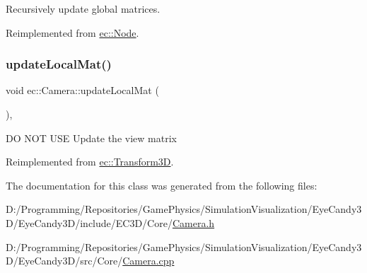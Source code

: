 Recursively update global matrices. 



Reimplemented from \mbox{\hyperlink{classec_1_1_node_a12a9b14ccc434c52404e262ef5db6f80}{ec\+::\+Node}}.

\mbox{\label{classec_1_1_camera_acff95ac4ca039715d67c83111d03b8c1}} 
\subsubsection{\texorpdfstring{update\+Local\+Mat()}{updateLocalMat()}}
{\footnotesize\ttfamily void ec\+::\+Camera\+::update\+Local\+Mat (\begin{DoxyParamCaption}{ }\end{DoxyParamCaption})\hspace{0.3cm}{\ttfamily [override]}, {\ttfamily [virtual]}}

DO N\+OT U\+SE Update the view matrix 

Reimplemented from \mbox{\hyperlink{classec_1_1_transform3_d_a68d259da063ea2aff48720ae55870445}{ec\+::\+Transform3D}}.



The documentation for this class was generated from the following files\+:\begin{DoxyCompactItemize}
\item 
D\+:/\+Programming/\+Repositories/\+Game\+Physics/\+Simulation\+Visualization/\+Eye\+Candy3\+D/\+Eye\+Candy3\+D/include/\+E\+C3\+D/\+Core/\mbox{\hyperlink{_camera_8h}{Camera.\+h}}\item 
D\+:/\+Programming/\+Repositories/\+Game\+Physics/\+Simulation\+Visualization/\+Eye\+Candy3\+D/\+Eye\+Candy3\+D/src/\+Core/\mbox{\hyperlink{_camera_8cpp}{Camera.\+cpp}}\end{DoxyCompactItemize}
